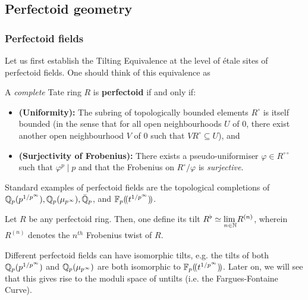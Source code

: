         \subsection{Perfectoid geometry}
            \subsubsection{Perfectoid fields}
    	        Let us first establish the Tilting Equivalence at the level of \'etale sites of perfectoid fields. One should think of this equivalence as  
    	    
        	    \begin{definition} \label{def: perfectoid_rings}
                    A \textit{complete} Tate ring $R$ is \textbf{perfectoid} if and only if:
                        \begin{itemize}
                            \item \textbf{(Uniformity):} The subring of topologically bounded elements $R^{\circ}$ is itself bounded (in the sense that for all open neighbourhoods $U$ of $0$, there exist another open neighbourhood $V$ of $0$ such that $VR^{\circ} \subseteq U$), and 
                            \item \textbf{(Surjectivity of Frobenius):} There exists a pseudo-uniformiser $\varphi \in R^{\circ \circ}$ such that $\varphi^p \mid p$ and that the Frobenius on $R^{\circ}/\varphi$ is \textit{surjective}.
                        \end{itemize}
                \end{definition}
                \begin{example}
                    Standard examples of perfectoid fields are the topological completions of $\mathbb{Q}_p(p^{1/p^{\infty}}), \mathbb{Q}_p(\mu_{p^{\infty}}), \bar{\mathbb{Q}}_p$, and $\mathbb{F}_p(\!(t^{1/p^{\infty}})\!)$.
                \end{example}
                
                \begin{definition}[Tilts] \label{def: tilts}
                    Let $R$ be any perfectoid ring. Then, one define its tilt $R^{\flat} \simeq \underset{n \in \mathbb{N}}{\operatorname{lim} \:} R^{(n)}$, wherein $R^{(n)}$ denotes the $n^{th}$ Frobenius twist of $R$.
                \end{definition}
                \begin{example}
                    Different perfectoid fields can have isomorphic tilts, e.g. the tilts of both $\mathbb{Q}_p(p^{1/p^{\infty}})$ and $\mathbb{Q}_p(\mu_{p^{\infty}})$ are both isomorphic to $\mathbb{F}_p(\!(t^{1/p^{\infty}})\!)$. Later on, we will see that this gives rise to the moduli space of untilts (i.e. the Fargues-Fontaine Curve).
                \end{example}
                
